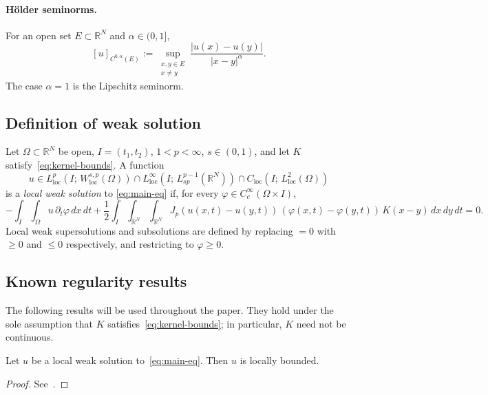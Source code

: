 \documentclass[11pt, a4paper, twoside]{article}
\theoremstyle{definition}
\theoremstyle{remark}
\newcommand{\R}{\mathbb{R}}
\begin{document}
\paragraph{H\"{o}lder seminorms.}
For an open set $E \subset \R^N$ and $\alpha \in (0,1]$,
\[
  [u]_{C^{0,\alpha}(E)}
  := \sup_{\substack{x,y \in E \\ x \neq y}}
     \frac{|u(x)-u(y)|}{|x-y|^\alpha}.
\]
The case $\alpha = 1$ is the Lipschitz seminorm.

\subsection*{Definition of weak solution}

\begin{definition}\label{def:weak-solution}
Let $\Omega \subset \R^N$ be open, $I = (t_1, t_2)$,
$1<p<\infty$, $s \in (0,1)$, and let $K$
satisfy~\eqref{eq:kernel-bounds}. A function
\[
  u \in L^p_{\mathrm{loc}}(I;\,
    W^{s,p}_{\mathrm{loc}}(\Omega))
  \cap L^\infty_{\mathrm{loc}}(I;\,
    L^{p-1}_{sp}(\R^N))
  \cap C_{\mathrm{loc}}(I;\,
    L^2_{\mathrm{loc}}(\Omega))
\]
is a \emph{local weak solution} to \eqref{eq:main-eq} if, for
every $\varphi \in C^\infty_c(\Omega \times I)$,
\begin{equation}\label{eq:weak-form}
  -\int_I \int_\Omega u\, \partial_t \varphi\, dx\, dt
  + \frac{1}{2}\int_I \int_{\R^N} \int_{\R^N}
    J_p(u(x,t)-u(y,t))\,
    (\varphi(x,t)-\varphi(y,t))\,
    K(x-y)\, dx\, dy\, dt = 0.
\end{equation}
Local weak supersolutions and subsolutions are defined by
replacing $= 0$ with $\ge 0$ and $\le 0$ respectively,
and restricting to $\varphi \ge 0$.
\end{definition}

\subsection*{Known regularity results}

The following results will be used throughout the
paper. They hold under the sole assumption that $K$
satisfies~\eqref{eq:kernel-bounds}; in particular, $K$
need not be continuous.

\begin{proposition}
\label{prop:linfinity}
  Let $u$ be a local weak solution
  to~\eqref{eq:main-eq}. Then $u$ is locally bounded.
\end{proposition}
\begin{proof}
  See~\cite{Stromqvist2019LocalBoundedness,
  DingZhangZhou2021, PrasadTewary2023,
  KumagaiWangZhang2024}.
\end{proof}
\end{document}
